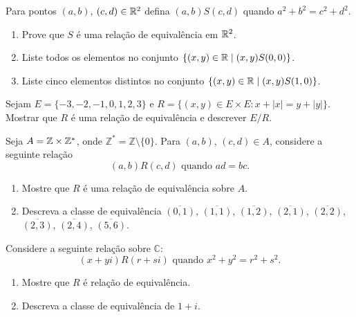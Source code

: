 \documentclass[12pt]{exam}
\begin{document}
\vspace{.3cm}

\questao{} Para pontos $(a, b)$, $(c, d) \in \mathbb{R}^2$ defina $(a, b) S (c, d)$ quando $a^2 + b^2 = c^2 + d^2$.
\begin{enumerate}[label={\alph*})]
  \item Prove que $S$ \'e uma rela\c{c}\~ao de equival\^encia em $\mathbb{R}^2$.
  \item Liste todos os elementos no conjunto $\{(x, y) \in \mathbb{R} \mid (x, y) S (0, 0)\}$.
  \item Liste cinco elementos distintos no conjunto $\{(x, y) \in \mathbb{R} \mid (x, y) S (1, 0)\}$.
\end{enumerate}

\vspace{.3cm}

\questao{} Sejam $E = \{-3, -2, -1, 0, 1, 2, 3\}$ e $R = \{(x, y) \in E \times E : x + |x| = y + |y|\}$. Mostrar que $R$ \'e uma rela\c{c}\~ao de equival\^encia e descrever $E/R$.

\vspace{.3cm}

\questao{} Seja $A = \mathbb{Z} \times \mathbb{Z}^*$, onde $\mathbb{Z}^* = \mathbb{Z} \setminus \{0\}$. Para $(a,b)$, $(c,d) \in A$, considere a seguinte rela{\c c}{\~a}o
\[
    (a,b) R (c,d) \mbox{ quando } ad = bc.
\]
\begin{enumerate}[label={\alph*})]
    \item Mostre que $R$ {\'e} uma rela{\c c}{\~a}o de equival{\^e}ncia sobre $A$.
    \item Descreva a classe de equival{\^e}ncia $\overline{(0,1)}$, $\overline{(1,1)}$, $\overline{(1,2)}$, $\overline{(2,1)}$, $\overline{(2,2)}$, $\overline{(2,3)}$, $\overline{(2,4)}$, $\overline{(5,6)}$.
\end{enumerate}

\vspace{.3cm}



\vspace{.3cm}

\questao{} Considere a seguinte rela{\c c}{\~a}o sobre $\mathbb{C}$:
\[
    (x+yi) R (r+si) \mbox{ quando } x^2+y^2=r^2+s^2.
\]
\begin{enumerate}[label={\alph*})]
    \item Mostre que $R$ {\'e} rela{\c c}{\~a}o de equival{\^e}ncia.
    \item Descreva a classe de equival{\^e}ncia de $1+i$.
\end{enumerate}
\end{document}

